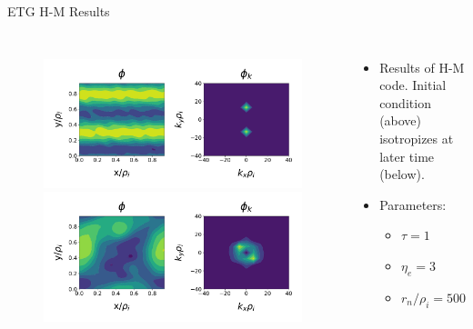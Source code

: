 \documentclass[aspectratio=43]{beamer}
\begin{document}
   \begin{frame}{ETG H-M Results}
      \begin{columns}
            \begin{figure}
               \vspace*{-.5cm}
               \includegraphics[height=.43\textheight, width=\textwidth]{Images/hmPhiETG_init.pdf}
               \includegraphics[height=.43\textheight, width=\textwidth]{Images/hmPhiETG_iso.pdf}
            \end{figure}
            \begin{itemize}
               \vspace*{-1cm}
               \item Results of H-M code. Initial condition (above) isotropizes at later time (below).
               \item Parameters:
                  \begin{itemize}
                     \item $\tau=1$
                     \item $\eta_e=3$
                     \item $r_n/\rho_i=500$
                  \end{itemize}
            \end{itemize}
      \end{columns}
   \end{frame}
\end{document}
